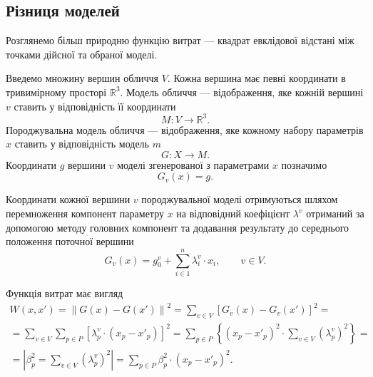 \subsection{Різниця моделей}

Розглянемо більш природню функцію витрат ---
квадрат евклідової відстані між точками дійсної та обраної моделі.

Введемо множину вершин обличчя $V$.
Кожна вершина має певні координати в тривимірному просторі $\mathbb{R}^3$.
Модель обличчя --- відображення,
яке кожній вершині $v$ ставить у відповідність її координати
\begin{equation*}
  M: V \rightarrow \mathbb{R}^3.
\end{equation*}
Породжувальна модель обличчя --- відображення,
яке кожному набору параметрів $x$ ставить у відповідність модель $m$
\begin{equation*}
  G: X \rightarrow M.
\end{equation*}
Координати $g$ вершини $v$ моделі згенерованої з параметрами $x$ позначимо
\begin{equation*}
  G_v\left( x \right) = g.
\end{equation*}

Координати кожної вершини $v$ породжувальної моделі отримуються шляхом
перемноження компонент параметру $x$ на відповідний коефіцієнт $\lambda^v$
отриманий за допомогою методу головних компонент
та додавання результату до середнього положення поточної вершини
\begin{equation*}
  G_v\left( x \right) = g_0^v + \sum_{i \in 1}^n \lambda_i^v \cdot x_i,
  \qquad v \in V.
\end{equation*}

Функція витрат має вигляд
\begin{equation*}
  \begin{split}
    W \left( x, x' \right)
    = \left\| G\left( x \right) - G\left( x' \right) \right\|^2
    = \sum_{v \in V} \left[
        G_v\left( x \right) - G_v\left( x' \right)
      \right]^2 = \\
    = \sum_{v \in V} \sum_{p \in P} \left[
        \lambda_p^v \cdot \left( x_p - x'_p \right)
      \right]^2
    = \sum_{p \in P} \left\{ \left( x_p - x'_p \right)^2
      \cdot \sum_{v \in V} \left( \lambda_p^v \right)^2 \right\} = \\
    = \left| \beta_p^2 = \sum_{v \in V} \left( \lambda_p^v \right)^2 \right|
    = \sum_{p \in P} \beta_p^2 \cdot \left( x_p - x'_p \right)^2.
  \end{split}
\end{equation*}


